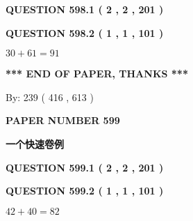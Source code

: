 \documentclass{ctexart}
\begin{document}
{\textbf{\Large{QUESTION
598.1 
 ( 2 , 2 , 201 )
}}}
  
  
  
\vspace{0.2in}
  
{\textbf{\Large{QUESTION
598.2 
 ( 1 , 1 , 101 )
}}}
  
  
 
 

$ %
30 +  %
61=   %
91$
 
 
   
   
 \vspace{0.2in}
 
   
   
   
   
\vspace{1.0in} 
{\textbf{\large{ *** END OF PAPER, THANKS *** }}} 
   
   
\hspace{1.0in} By: 
 239 ( 416 ,  613 )
   
   
   
   
\newpage 
\setcounter{page}{ 
   599001 } 
   
   
   
   
 {\textbf{ \Large{ PAPER NUMBER  599  }}}
   
   
\vspace{0.2in}
   
   
   
   
   
   
 \vspace{0.2in}
{\LARGE {\textbf{ 一个快速卷例}}}
   
   
  
\vspace{0.2in}
  
{\textbf{\Large{QUESTION
599.1 
 ( 2 , 2 , 201 )
}}}
  
  
  
\vspace{0.2in}
  
{\textbf{\Large{QUESTION
599.2 
 ( 1 , 1 , 101 )
}}}
  
  
 
 

$ %
42 +  %
40=   %
82$
 
 
   
   
 \vspace{0.2in}
 
   
   
\end{document}
